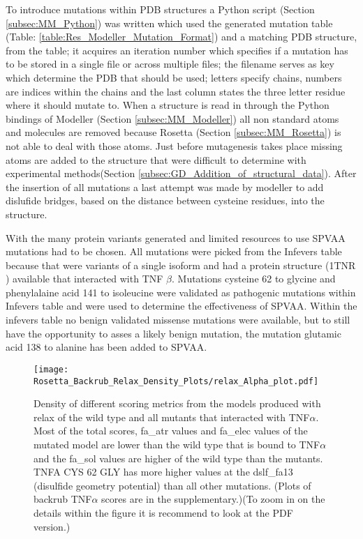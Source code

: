 	To introduce mutations within PDB structures a Python script (Section \ref{subsec:MM_Python}) was written which used the generated mutation table (Table: \ref{table:Res_Modeller_Mutation_Format}) and a matching PDB structure, from the table; it acquires an iteration number which specifies if a mutation has to be stored in a single file or across multiple files; the filename serves as key which determine the PDB that should be used; letters specify chains, numbers are indices within the chains and the last column states the three letter residue where it should mutate to. When a structure is read in through the Python bindings of Modeller (Section \ref{subsec:MM_Modeller}) all non standard atoms and molecules are removed because Rosetta (Section \ref{subsec:MM_Rosetta}) is not able to deal with those atoms. Just before mutagenesis takes place missing atoms are added to the structure that were difficult to determine with experimental methods(Section \ref{subsec:GD_Addition_of_structural_data}). After the insertion of all mutations a last attempt was made by modeller to add dislufide bridges, based on the distance between cysteine residues, into the structure.
	
	With the many protein variants generated and limited resources to use SPVAA mutations had to be chosen. All mutations were picked from the Infevers table because that were variants of a single isoform and had a protein structure (1TNR \cite{banner_crystal_1993}) available that interacted with TNF $\beta$. 
	Mutations cysteine 62 to glycine and phenylalaine acid 141 to isoleucine were validated as pathogenic mutations within Infevers table and were used to determine the effectiveness of SPVAA. Within the infevers table no benign validated missense mutations were available, but to still have the opportunity to asses a likely benign mutation, the mutation glutamic acid 138 to alanine has been added to SPVAA.	
	
	\newpage
	\begin{figure}[!ht]
		\centering
		\texttt{[image: Rosetta\_Backrub\_Relax\_Density\_Plots/relax\_Alpha\_plot.pdf]}
		\caption[TNFRSF1A homotrimer with TNF$\alpha$ homotrimer relax density plots]{Density of different scoring metrics from the models produced with relax of the wild type and all mutants that interacted with TNF$\alpha$. Most of the total scores, fa\_atr values and fa\_elec values of the mutated model are lower than the wild type that is bound to TNF$\alpha$ and the fa\_sol values are higher of the wild type than the mutants. TNFA CYS 62 GLY has more higher values at the dslf\_fa13 (disulfide geometry potential) than all other mutations. (Plots of backrub TNF$\alpha$ scores are in the supplementary.)(To zoom in on the details within the figure it is recommend to look at the PDF version.)}
		\label{fig:relax_TNFA_scores}
	\end{figure}

